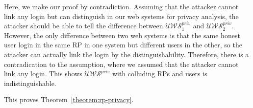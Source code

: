   Here, we make our proof by contradiction.
  Assuming that the attacker cannot link any login but can 
  distinguish in our web systems for privacy analysis, 
  the attacker should be able to tell the difference between 
  $\mathcal{U\!W\!S}^{priv}_1$ and $\mathcal{U\!W\!S}^{priv}_2$.
  However, the only difference between two web systems is that 
  the same honest user login in the same RP in one system but 
  different users in the other, so the attacker can actually 
  link the login by the distinguishability. Therefore, there is 
  a contradication to the assumption, where we assumed that the 
  attacker cannot link any login. This shows $\mathcal{U\!W\!S}^{priv}$ 
  with colluding RPs and users is indistinguishable.
  \oldc

  This proves Theorem~\ref{theorem:rp-privacy}.\QED
  

  